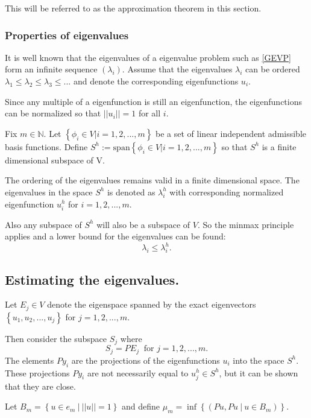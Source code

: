 \documentclass[../../main.tex]{subfiles}
\begin{document}
This will be referred to as the approximation theorem in this section.

\subsubsection*{Properties of eigenvalues}
It is well known that the eigenvalues of a eigenvalue problem such as \eqref{GEVP} form an infinite sequence $(\lambda_i)$. Assume that the eigenvalues $\lambda_i$ can be ordered $\lambda_1 \leq \lambda_2 \leq \lambda_3 \leq ...$ and denote the corresponding eigenfunctions $u_i$.

Since any multiple of a eigenfunction is still an eigenfunction, the eigenfunctions can be normalized so that $||u_i|| = 1$ for all $i$.

Fix $m \in \mathbb{N}$. Let $\left\{ \phi_i \in V | i = 1,2,...,m \right\}$ be a set of linear independent admissible basis functions. Define $S^h := \text{span}\left\{\phi_i \in V | i = 1,2,...,m\right\}$ so that $S^h$ is a finite dimensional subspace of V. \label{sym:natural} \label{sym:Sh1}

The ordering of the eigenvalues remains valid in a finite dimensional space. The eigenvalues in the space $S^h$ is denoted as $\lambda_i^h$ with corresponding normalized eigenfunction $u^h_i$ for $i = 1,2,...,m$.

Also any subspace of $S^h$ will also be a subspace of $V$. So the minmax principle applies and a lower bound for the eigenvalues can be found:
\begin{equation}
	\lambda_i \leq \lambda_i^h.
\end{equation}

\subsection{Estimating the eigenvalues.}
Let $E_j \in V$ denote the eigenspace spanned by the exact eigenvectors $\left\{u_1,u_2,...,u_j \right\}$ for $j = 1,2,...,m$.

Then consider the subspace $S_j$ where
\begin{equation*}
	S_j = PE_j \ \text{ for } j = 1,2,...,m.
\end{equation*} The elements $Py_i$ are the projections of the eigenfunctions $u_i$ into the space $S^h$. These projections $Py_i$ are not necessarily equal to $u^h_j \in S^h$, but it can be shown that they are close.

Let $B_m = \left\{u \in e_m \ | \ ||u|| = 1 \right\}$ and define $\mu_m = \inf\left\{(Pu,Pu \ | \ u \in B_m)\right\}$.
\end{document}
